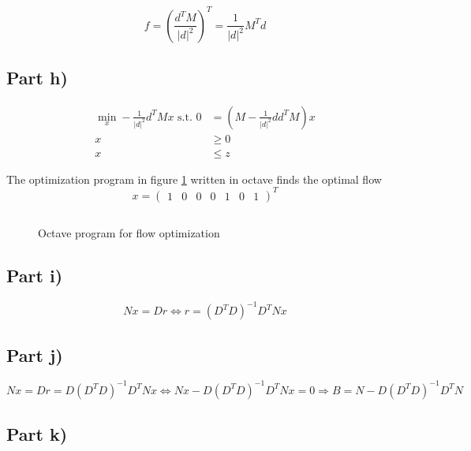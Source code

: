 \documentclass[10pt,a4paper]{article}
\begin{document}
\begin{equation*}
  f = \left(\frac{d^{T}M}{|d|^{2}}\right)^{T} = \frac{1}{|d|^{2}}M^{T}d
\end{equation*}

\subsection*{Part h)}

\begin{align*}
  \min_{x} -\frac{1}{|d|^{2}}d^{T}Mx \text{ s.t. } 0 & = \left( M - \frac{1}{|d|^{2}}dd^{T}M \right)x\\
  x & \ge 0\\
  x & \le z
\end{align*}

The optimization program in figure \ref{fig:optimization-octave} written in octave finds the optimal flow
\begin{equation*}
  x = \begin{pmatrix}
    1 & 0 & 0 & 0 & 1 & 0 & 1
  \end{pmatrix}^{T}
\end{equation*}

\begin{figure}
  \inputminted{octave}{sheet-6/optimizeflow.m}
  \caption{Octave program for flow optimization}
  \label{fig:optimization-octave}
\end{figure}

\subsection*{Part i)}

\begin{equation*}
  Nx = Dr \Leftrightarrow r = (D^{T}D)^{-1}D^{T}Nx
\end{equation*}

\subsection*{Part j)}

\begin{equation*}
  Nx = Dr = D(D^{T}D)^{-1}D^{T}Nx \Leftrightarrow Nx - D(D^{T}D)^{-1}D^{T}Nx = 0 \Rightarrow B = N - D(D^{T}D)^{-1}D^{T}N
\end{equation*}

\subsection*{Part k)}
\end{document}
